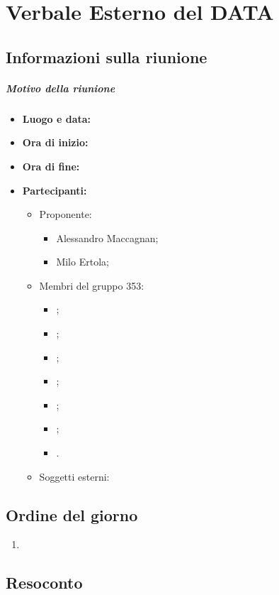 \documentclass[RaccoltaVerbali.tex]{subfiles}
\begin{document}
\chapter{Verbale Esterno del DATA}
\section{Informazioni sulla riunione}
\paragraph{Motivo della riunione}
\begin{itemize}
	\item \textbf{Luogo e data:}
	\item \textbf{Ora di inizio:}
	\item \textbf{Ora di fine:}
	\item \textbf{Partecipanti:}
	\begin{itemize}
		\item Proponente:
		\begin{itemize}
			\item Alessandro Maccagnan;
			\item Milo Ertola;
		\end{itemize}
		\item Membri del gruppo 353:
		\begin{itemize}
			\item \Davide;
			\item \Elena;
			\item \Gianluca;
			\item \Mirco;
			\item \Parwinder;
			\item \Riccardo;
			\item \Valentina.
		\end{itemize}
		\item Soggetti esterni:
	\end{itemize}
\end{itemize}
\section{Ordine del giorno}	
\begin{enumerate}
	\item 
\end{enumerate}
\section{Resoconto}
\end{document}
